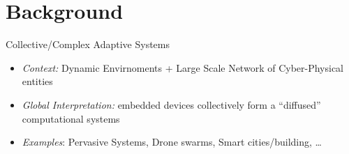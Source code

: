 \documentclass[8pt, aspectratio=169, handout]{beamer}
\begin{document}
\section{Background}
\begin{frame}{Collective/Complex Adaptive Systems}
  \begin{card}
    \begin{itemize}
      \item [\faArrowRight] \emph{Context:} Dynamic Envirnoments + Large Scale Network of Cyber-Physical entities
      \item [\faArrowRight] \emph{Global Interpretation:} embedded devices collectively form a ``diffused'' computational systems
      \item [\faArrowRight] \emph{Examples}: Pervasive Systems, Drone swarms, Smart cities/building, \dots
    \end{itemize}
  \end{card}
  \centering
  \begin{multicols*}{3}
  \end{multicols*}
\end{frame}
\end{document}

